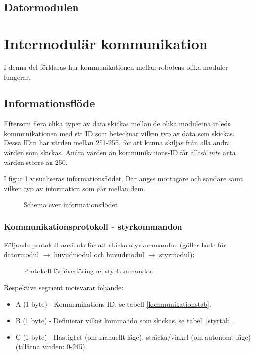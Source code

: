 \documentclass[11pt]{article}
\begin{document}
\begin{flushleft}
\subsection{Datormodulen}

\section{Intermodulär kommunikation}
I denna del förklaras hur kommunikationen mellan robotens olika moduler fungerar.

\subsection{Informationsflöde}
Eftersom flera olika typer av data skickas mellan de olika modulerna inleds kommunikationen med ett ID som betecknar vilken typ av data som skickas. Dessa ID:n har värden mellan 251-255, för att kunna skiljas från alla andra värden som skickas. Andra värden än kommunikations-ID får alltså \emph{inte} anta värden större än 250. 

I figur \ref{informationFlow} visualiseras informationsflödet. Där anges mottagare och sändare samt vilken typ av information som går mellan dem.

\begin{figure}[htbp]
\centering
\noindent\resizebox{.8\linewidth}{!}{
	}
	\caption{Schema över informationsflödet\label{informationFlow}}	
\end{figure}

\subsubsection{Kommunikationsprotokoll - styrkommandon}
Följande protokoll används för att skicka styrkommandon (gäller både för datormodul $\rightarrow$ huvudmodul och huvudmodul $\rightarrow$ styrmodul):

\begin{figure}[htbp]
\centering
\noindent\resizebox{.8\linewidth}{!}{
	}
	\caption{Protokoll för överföring av styrkommandon\label{styrdata}}	
\end{figure}

Respektive segment motsvarar följande: 
\begin{itemize}
	\item A (1 byte) - Kommunikations-ID, se tabell \ref{kommunikationstab}.
	\item B (1 byte) - Definierar vilket kommando som skickas, se tabell \ref{styrtab}.
	\item C (1 byte) - Hastighet (om manuellt läge), sträcka/vinkel (om autonomt läge)(tillåtna värden: 0-245).
\end{itemize}


\end{flushleft}
\end{document}
